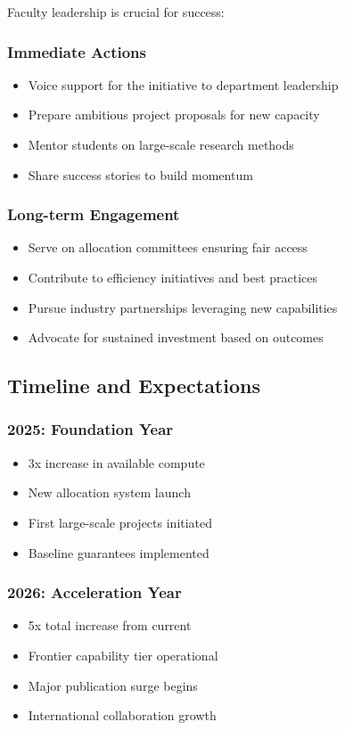 Faculty leadership is crucial for success:

\subsubsection{Immediate Actions}
\begin{itemize}
\item Voice support for the initiative to department leadership
\item Prepare ambitious project proposals for new capacity
\item Mentor students on large-scale research methods
\item Share success stories to build momentum
\end{itemize}

\subsubsection{Long-term Engagement}
\begin{itemize}
\item Serve on allocation committees ensuring fair access
\item Contribute to efficiency initiatives and best practices
\item Pursue industry partnerships leveraging new capabilities
\item Advocate for sustained investment based on outcomes
\end{itemize}

\subsection{Timeline and Expectations}

\subsubsection{2025: Foundation Year}
\begin{itemize}
\item 3x increase in available compute
\item New allocation system launch
\item First large-scale projects initiated
\item Baseline guarantees implemented
\end{itemize}

\subsubsection{2026: Acceleration Year}
\begin{itemize}
\item 5x total increase from current
\item Frontier capability tier operational
\item Major publication surge begins
\item International collaboration growth
\end{itemize}

